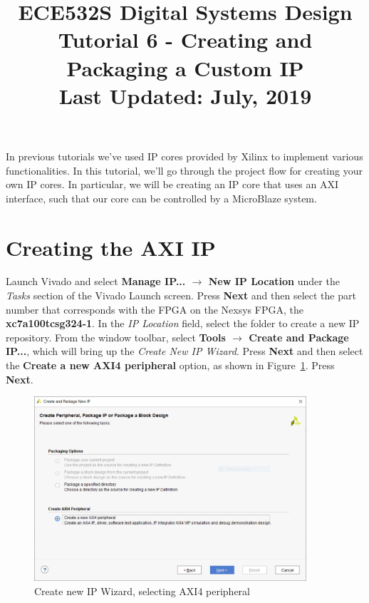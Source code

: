 \documentclass[11pt]{article}
\title{ECE532S Digital Systems Design \\ \vspace{0.4cm}
       \Large Tutorial 6 - Creating and Packaging a Custom IP \\ \vspace{0.4cm}
       \small Last Updated: July, 2019}
\author{ }
\date{ }
\begin{document}
\maketitle
\vspace{-1cm}

In previous tutorials we've used IP cores provided by Xilinx to implement various functionalities. In this tutorial, we'll go through the project flow for creating your own IP cores. In particular, we will be creating an IP core that uses an AXI interface, such that our core can be controlled by a MicroBlaze system.




\section{Creating the AXI IP}
\label{sec:create_axi_ip}
Launch Vivado and select \textbf{Manage IP... $\rightarrow$ New IP Location} under the \textit{Tasks} section of the Vivado Launch screen. Press \textbf{Next} and then select the part number that corresponds with the FPGA on the Nexsys FPGA, the \textbf{xc7a100tcsg324-1}. In the \textit{IP Location} field, select the folder to create a new IP repository. From the window toolbar, select \textbf{Tools $\rightarrow$ Create and Package IP...}, which will bring up the \textit{Create New IP Wizard}. Press \textbf{Next} and then select the \textbf{Create a new AXI4 peripheral} option, as shown in Figure~\ref{fig:create_axi_ip}. Press \textbf{Next}.

\begin{figure}[!h]
    \centering
    \includegraphics[width=0.9\textwidth]{images/create_axi_ip.png}
    \caption{Create new IP Wizard, selecting AXI4 peripheral}
    \label{fig:create_axi_ip}
\end{figure}
\end{document}
